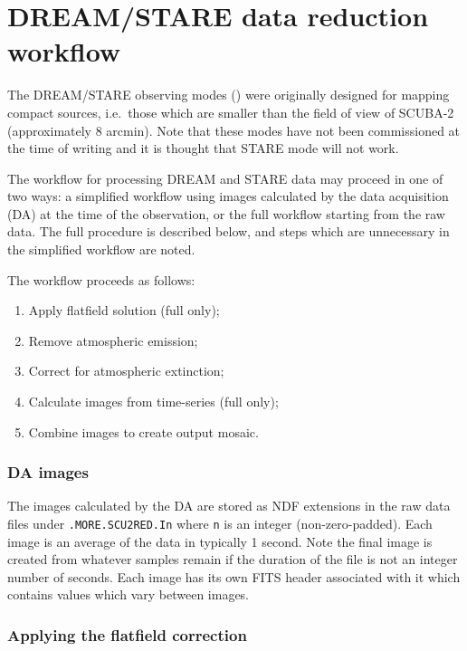 \documentclass[oneside,11pt]{starlink}
\begin{document}
\sstnomaintoc

\sstmaintoc


\section{DREAM/STARE data reduction workflow\label{se:dsworkflow}}

The DREAM/STARE observing modes (\cite{scuba2}) were originally
designed for mapping compact sources, i.e.\ those which are smaller
than the field of view of SCUBA-2 (approximately 8 arcmin). Note that
these modes have not been commissioned at the time of writing and it
is thought that STARE mode will not work.

The workflow for processing DREAM and STARE data may proceed in one of
two ways: a simplified workflow using images calculated by the data
acquisition (DA) at the time of the observation, or the full workflow
starting from the raw data. The full procedure is described below, and
steps which are unnecessary in the simplified workflow are noted.

The workflow proceeds as follows:
\begin{enumerate}
\item Apply flatfield solution (full only);
\item Remove atmospheric emission;
\item Correct for atmospheric extinction;
\item Calculate images from time-series (full only);
\item Combine images to create output mosaic.
\end{enumerate}

\subsubsection{DA images}

The images calculated by the DA are stored as NDF extensions in the
raw data files under \texttt{.MORE.SCU2RED.In} where \texttt{n} is an
integer (non-zero-padded). Each image is an average of the data in
typically 1 second. Note the final image is created from whatever
samples remain if the duration of the file is not an integer number of
seconds. Each image has its own FITS header associated with it which
contains values which vary between images.

\subsubsection{Applying the flatfield correction\label{se:flatfield}}
\end{document}
